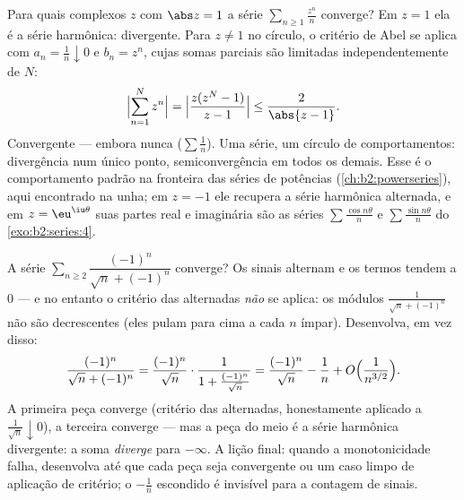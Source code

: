 \begin{example}\label{ex:b2:series:abelboundary}
Para quais complexos $z$ com $\abs z = 1$ a série $\sum_{n \geq 1}
\frac{z^n}{n}$ converge? Em $z = 1$ ela é a série harmônica:
divergente. Para $z \neq 1$ no círculo, o critério de Abel se aplica
com $a_n = \frac1n \downarrow 0$ e $b_n = z^n$, cujas somas
parciais são limitadas independentemente de $N$:
\[
\Bigl|\sum_{n=1}^{N} z^n\Bigr|
= \Bigl|\frac{z(z^N - 1)}{z - 1}\Bigr|
\leq \frac{2}{\abs{z - 1}} .
\]
Convergente --- embora nunca  ($\sum\frac1n$). Uma
série, um círculo de comportamentos: divergência num único ponto,
semiconvergência em todos os demais. Esse é o comportamento padrão na fronteira
das séries de potências (\cref{ch:b2:powerseries}), aqui encontrado
na unha; em $z = -1$ ele recupera a série harmônica
alternada, e em $z = \eu^{\iu\theta}$ suas partes real e
imaginária são as séries $\sum\frac{\cos
n\theta}{n}$ e $\sum\frac{\sin n\theta}{n}$ do
\cref{exo:b2:series:4}.
\end{example}

\begin{example}\label{ex:b2:series:trap}
A série $\sum_{n\geq2} \dfrac{(-1)^n}{\sqrt n + (-1)^n}$ converge?
Os sinais alternam e os termos tendem a $0$ --- e no entanto o
critério das alternadas \emph{não} se aplica: os módulos
$\frac{1}{\sqrt n + (-1)^n}$ não são decrescentes (eles pulam para cima a
cada $n$ ímpar). Desenvolva, em vez disso:
\[
\frac{(-1)^n}{\sqrt n + (-1)^n}
= \frac{(-1)^n}{\sqrt n}\cdot
\frac{1}{1 + \frac{(-1)^n}{\sqrt n}}
= \frac{(-1)^n}{\sqrt n} - \frac{1}{n}
+ O\Bigl(\frac{1}{n^{3/2}}\Bigr).
\]
A primeira peça converge (critério das alternadas, honestamente aplicado a
$\frac1{\sqrt n}\downarrow0$), a terceira converge 
--- mas a peça do meio é a série harmônica divergente: a
soma \emph{diverge} para $-\infty$. A lição final: quando a
monotonicidade falha, desenvolva até que cada peça seja
 convergente ou um caso limpo de aplicação de critério; o
$-\frac1n$ escondido é invisível para a contagem de sinais.
\end{example}


